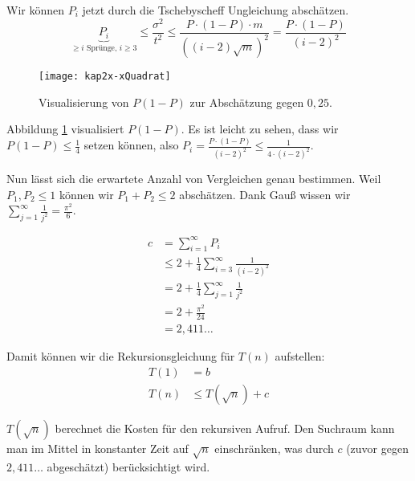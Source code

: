 \begin{Lza}
Wir können $P_i$ jetzt durch die Tschebyscheff Ungleichung abschätzen.
\[ \underbrace{P_i}_{\ge i \text{ Sprünge, } i \ge 3} \le \frac{\sigma^2}{t^2} \le \frac{P \cdot (1-P) \cdot m}{((i-2)\sqrt{m})^2} = \frac{P \cdot (1-P)}{(i-2)^2} \]

\begin{figure}[htb]
	\centering
	\texttt{[image: kap2x-xQuadrat]}
	\caption{Visualisierung von $P(1-P)$ zur Abschätzung gegen $0,25$.}
	\label{kap2x-xQuadrat}
\end{figure}

Abbildung \ref{kap2x-xQuadrat} visualisiert $P(1-P)$. Es ist leicht zu sehen, dass wir $P(1-P) \le \frac{1}{4}$ setzen können, also $P_i = \frac{P \cdot (1-P)}{(i-2)^2} \le \frac{1}{4 \cdot (i-2)^2}$.

Nun lässt sich die erwartete Anzahl von Vergleichen genau bestimmen. Weil $P_1, P_2 \le 1$ können wir $P_1+P_2 \le 2$ abschätzen. Dank Gauß wissen wir $\sum_{j=1}^{\infty} \frac{1}{j^2} = \frac{\pi^2}{6}$.

\begin{align*}
	c &= \sum_{i=1}^{\infty} P_i\\
	  &\le 2 + \frac{1}{4} \sum_{i=3}^{\infty} \frac{1}{(i-2)^2} \\
	  &= 2 + \frac{1}{4} \sum_{j=1}^{\infty} \frac{1}{j^2}\\
	  &= 2 + \frac{\pi^2}{24}\\
	  &= 2,411\ldots
\end{align*}

Damit können wir die Rekursionsgleichung für $T(n)$ aufstellen:
\begin{align*}
  T(1) &= b \\
  T(n) &\le T(\sqrt{n}) + c
\end{align*}

$T(\sqrt{n})$ berechnet die Kosten für den rekursiven Aufruf. Den Suchraum kann man im Mittel in konstanter Zeit auf $\sqrt{n}$ einschränken, was durch $c$ (zuvor gegen $2,411\ldots$ abgeschätzt) berücksichtigt wird.


\end{Lza}
